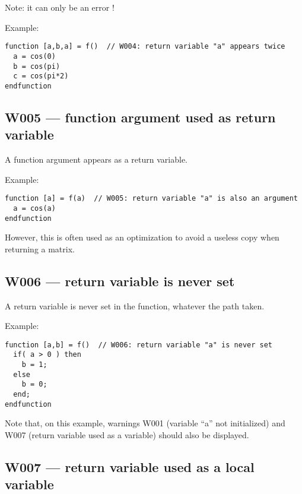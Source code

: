 Note: it can only be an error !



Example:\begin{verbatim}
function [a,b,a] = f()  // W004: return variable "a" appears twice
  a = cos(0)
  b = cos(pi)
  c = cos(pi*2)
endfunction
\end{verbatim}




\subsection{W005 --- function argument used as return variable  }




A function argument appears as a return variable.



Example:\begin{verbatim}
function [a] = f(a)  // W005: return variable "a" is also an argument
  a = cos(a)
endfunction
\end{verbatim}




However, this is often used as an optimization to avoid
a useless copy when returning a matrix.



\subsection{W006 --- return variable is never set}




A return variable is never set in the function,
whatever the path taken.



Example:\begin{verbatim}
function [a,b] = f()  // W006: return variable "a" is never set
  if( a > 0 ) then
    b = 1;
  else
    b = 0;
  end;
endfunction
\end{verbatim}
Note that, on this example, warnings W001
(variable ``a'' not initialized)
and W007 (return variable used as a variable) should also be displayed.



\subsection{W007 --- return variable used as a local variable}




